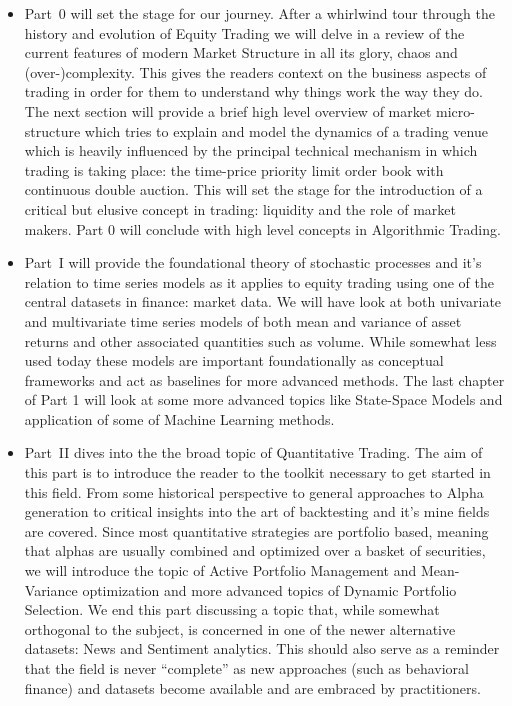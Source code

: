 \begin{itemize}
\item Part~0 will set the stage for our journey. After a whirlwind tour through the history and evolution of Equity Trading we will delve in a review of the current features of modern Market Structure in all its glory, chaos and (over-)complexity. This gives the readers context on the business aspects of trading in order for them to understand why things work the way they do. The next section will provide a brief high level overview of market micro-structure which tries to explain and model the dynamics of a trading venue which is heavily influenced by the principal technical mechanism in which trading is taking place: the time-price priority limit order book with  continuous double auction. This will set the stage for the introduction of a critical but elusive concept in trading: liquidity and the role of market makers. Part 0 will conclude with high level concepts in Algorithmic Trading.

\item Part~I will provide the foundational theory of stochastic processes and it's relation to time series models as it applies to equity trading using one of the central datasets in finance: market data. We will have look at both univariate and multivariate time series models of both mean and variance of asset returns and other associated quantities such as volume. While somewhat less used today these models are important foundationally as conceptual frameworks and act as baselines for more advanced methods. The last chapter of Part 1 will look at some more advanced topics like State-Space Models and application of some of Machine Learning methods.

\item Part~II dives into the the broad topic of Quantitative Trading. The aim of this part is to introduce the reader to the toolkit necessary to get started in this field. From some historical perspective to general approaches to Alpha generation to critical insights into the art of backtesting and it's mine fields are covered. Since most quantitative strategies are portfolio based, meaning that alphas are usually  combined  and optimized over a basket of securities, we will introduce the topic of Active Portfolio Management and Mean-Variance optimization and more advanced topics of Dynamic Portfolio Selection. We end this part discussing a topic that, while somewhat orthogonal to the subject, is concerned in one of the newer alternative datasets: News and Sentiment analytics. This should also serve as a reminder that the field is never ``complete'' as new approaches (such as behavioral finance) and datasets become available and are embraced by practitioners.


\end{itemize}
